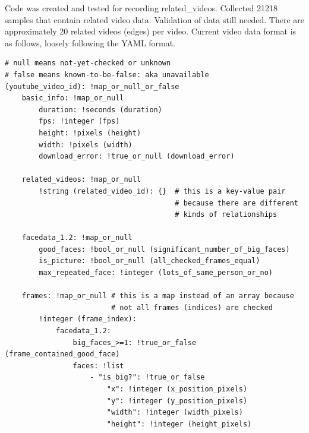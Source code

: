 \documentclass{article}
\newcommand{\br}{ \hfill \break}
\begin{document}
%
%
%
\date{June 1 2020} \br \begin{adjustwidth}{2.5em}{0pt}
Code was created and tested for recording related\_videos. Collected 21218 samples that contain related video data. Validation of data still needed. There are approximately 20 related videos (edges) per video. Current video data format is as follows, loosely following the YAML format.

\begin{lstlisting}
# null means not-yet-checked or unknown
# false means known-to-be-false: aka unavailable
(youtube_video_id): !map_or_null_or_false
    basic_info: !map_or_null
        duration: !seconds (duration)
        fps: !integer (fps)
        height: !pixels (height)
        width: !pixels (width)
        download_error: !true_or_null (download_error)
        
    related_videos: !map_or_null
        !string (related_video_id): {}  # this is a key-value pair
                                        # because there are different 
                                        # kinds of relationships
    
    facedata_1.2: !map_or_null
        good_faces: !bool_or_null (significant_number_of_big_faces)
        is_picture: !bool_or_null (all_checked_frames_equal)
        max_repeated_face: !integer (lots_of_same_person_or_no)
    
    frames: !map_or_null # this is a map instead of an array because 
                         # not all frames (indices) are checked
        !integer (frame_index):
            facedata_1.2: 
                big_faces_>=1: !true_or_false (frame_contained_good_face)
                faces: !list
                    - "is_big?": !true_or_false
                        "x": !integer (x_position_pixels)
                        "y": !integer (y_position_pixels)
                        "width": !integer (width_pixels)
                        "height": !integer (height_pixels)
\end{lstlisting}
\end{adjustwidth} \br
\end{document}
